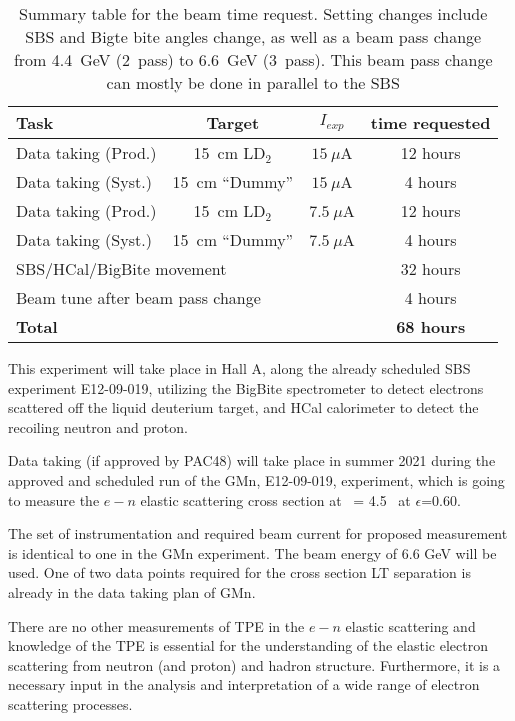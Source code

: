 \begin{table}[h]
\centering
\begin{tabular}{|l|c|c|c|}
\hline
Task & Target & $I_{exp}$ & time requested \\
\hline
Data taking (Prod.) & 15~cm LD$_2$ & $15~\mu$A & 12 hours \\ 
\hline
Data taking (Syst.) & 15~cm ``Dummy'' & $15~\mu$A & 4 hours \\ 
\hline
Data taking (Prod.) & 15~cm LD$_2$ & $7.5~\mu$A & 12 hours \\ 
\hline
Data taking (Syst.) & 15~cm ``Dummy'' & $7.5~\mu$A & 4 hours \\ 
\hline
\multicolumn{3}{|l|}{SBS/HCal/BigBite movement} & 32 hours \\
\multicolumn{3}{|l|}{Beam tune after beam pass change} & 4 hours \\
\hline
\hline
\multicolumn{3}{|l|}{\bf Total} & {\bf 68 hours} \\
\hline
\end{tabular} 
\caption{Summary table for the beam time request. Setting changes include SBS and Bigte bite angles change, as well as a beam pass change from 4.4~GeV (2~pass) to 6.6~GeV (3~pass). This beam pass change can mostly be done in parallel to the SBS}%
\label{tab:beamtime}
\end{table}

This experiment will take place in Hall A, along the already scheduled SBS \gmn experiment E12-09-019, utilizing the BigBite spectrometer to detect electrons scattered off 
the liquid deuterium target, and HCal calorimeter to detect the recoiling neutron and proton.

Data taking (if approved by PAC48) will take place in summer 2021 during the approved and scheduled run of the GMn, E12-09-019, experiment,
which is going to measure the $e-n$ elastic scattering cross section at \qsq~= 4.5 \gevcsq~at $\epsilon$=0.60.

The set of instrumentation and required beam current for proposed measurement is identical to one in the GMn experiment.
The beam energy of 6.6 GeV will be used.
One of two data points required for the cross section LT separation is already in the data taking plan of GMn.

There are no other measurements of TPE in the $e-n$ elastic scattering and knowledge of the TPE is essential for the understanding 
of the elastic electron scattering from neutron (and proton) and hadron structure.  
Furthermore, it is a necessary input in the analysis and interpretation of a wide range of electron scattering processes. 

